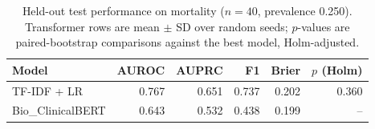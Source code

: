 \begin{table}[t]
\centering
\caption{Held-out test performance on mortality ($n=40$, prevalence 0.250). Transformer rows are mean $\pm$ SD over random seeds; $p$-values are paired-bootstrap comparisons against the best model, Holm-adjusted.}
\label{tab:main}
\begin{tabular}{lrrrrr}
\toprule
Model & AUROC & AUPRC & F1 & Brier & $p$ (Holm) \\
\midrule
TF-IDF + LR & 0.767 & 0.651 & 0.737 & 0.202 & 0.360 \\
Bio_ClinicalBERT & 0.643 & 0.532 & 0.438 & 0.199 & -- \\
\bottomrule
\end{tabular}
\end{table}
